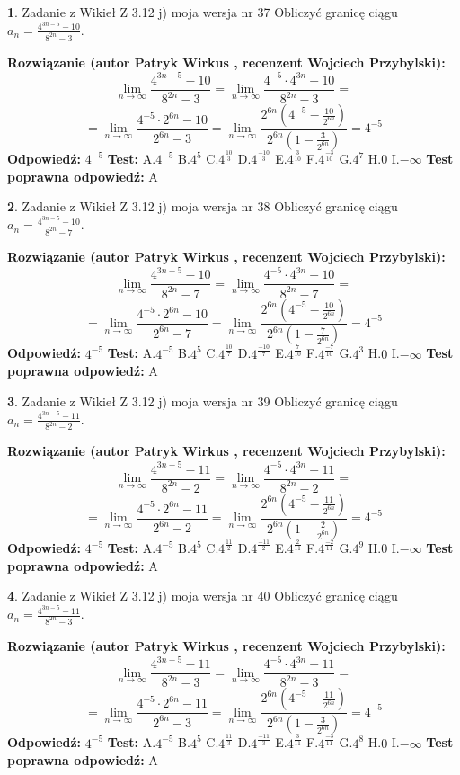 \documentclass[12pt, a4paper]{article}
\theoremstyle{definition} %
\newtheorem{zad}{}
\newcommand{\zadStart}[1]{\begin{zad}#1\newline}
\newcommand{\zadStop}{\end{zad}}
\newcommand{\rozwStart}[2]{\noindent \textbf{Rozwiązanie (autor #1 , recenzent #2): }\newline}
\newcommand{\rozwStop}{\newline}
\newcommand{\odpStart}{\noindent \textbf{Odpowiedź:}\newline}
\newcommand{\odpStop}{\newline}
\newcommand{\testStart}{\noindent \textbf{Test:}\newline}
\newcommand{\testStop}{\newline}
\newcommand{\kluczStart}{\noindent \textbf{Test poprawna odpowiedź:}\newline}
\newcommand{\kluczStop}{\newline}
\begin{document}
\zadStart{Zadanie z Wikieł Z 3.12 j) moja wersja nr 37}
Obliczyć granicę ciągu $a_{n}=\frac{4^{3n-5}-10}{8^{2n}-3}$.
\zadStop
\rozwStart{Patryk Wirkus}{Wojciech Przybylski}
$$\lim\limits_{n\to\infty}\frac{4^{3n-5}-10}{8^{2n}-3}= \lim\limits_{n\to\infty}\frac{4^{-5} \cdot 4^{3n}-10}{8^{2n}-3}=$$
$$= \lim\limits_{n\to\infty}\frac{4^{-5} \cdot 2^{6n}-10}{2^{6n}-3}= \lim\limits_{n\to\infty}\frac{2^{6n}(4^{-5} - \frac{10}{2^{6n}})}{2^{6n}(1-\frac{3}{2^{6n}})}= 4^{-5}$$
\rozwStop
\odpStart
$4^{-5}$
\odpStop
\testStart
A.$4^{-5}$
B.$4^{5}$
C.$4^{\frac{10}{3}}$
D.$4^{\frac{-10}{3}}$
E.$4^{\frac{3}{10}}$
F.$4^{\frac{-3}{10}}$
G.$4^{7}$
H.$0$
I.$-\infty$
\testStop
\kluczStart
A
\kluczStop



\zadStart{Zadanie z Wikieł Z 3.12 j) moja wersja nr 38}
Obliczyć granicę ciągu $a_{n}=\frac{4^{3n-5}-10}{8^{2n}-7}$.
\zadStop
\rozwStart{Patryk Wirkus}{Wojciech Przybylski}
$$\lim\limits_{n\to\infty}\frac{4^{3n-5}-10}{8^{2n}-7}= \lim\limits_{n\to\infty}\frac{4^{-5} \cdot 4^{3n}-10}{8^{2n}-7}=$$
$$= \lim\limits_{n\to\infty}\frac{4^{-5} \cdot 2^{6n}-10}{2^{6n}-7}= \lim\limits_{n\to\infty}\frac{2^{6n}(4^{-5} - \frac{10}{2^{6n}})}{2^{6n}(1-\frac{7}{2^{6n}})}= 4^{-5}$$
\rozwStop
\odpStart
$4^{-5}$
\odpStop
\testStart
A.$4^{-5}$
B.$4^{5}$
C.$4^{\frac{10}{7}}$
D.$4^{\frac{-10}{7}}$
E.$4^{\frac{7}{10}}$
F.$4^{\frac{-7}{10}}$
G.$4^{3}$
H.$0$
I.$-\infty$
\testStop
\kluczStart
A
\kluczStop



\zadStart{Zadanie z Wikieł Z 3.12 j) moja wersja nr 39}
Obliczyć granicę ciągu $a_{n}=\frac{4^{3n-5}-11}{8^{2n}-2}$.
\zadStop
\rozwStart{Patryk Wirkus}{Wojciech Przybylski}
$$\lim\limits_{n\to\infty}\frac{4^{3n-5}-11}{8^{2n}-2}= \lim\limits_{n\to\infty}\frac{4^{-5} \cdot 4^{3n}-11}{8^{2n}-2}=$$
$$= \lim\limits_{n\to\infty}\frac{4^{-5} \cdot 2^{6n}-11}{2^{6n}-2}= \lim\limits_{n\to\infty}\frac{2^{6n}(4^{-5} - \frac{11}{2^{6n}})}{2^{6n}(1-\frac{2}{2^{6n}})}= 4^{-5}$$
\rozwStop
\odpStart
$4^{-5}$
\odpStop
\testStart
A.$4^{-5}$
B.$4^{5}$
C.$4^{\frac{11}{2}}$
D.$4^{\frac{-11}{2}}$
E.$4^{\frac{2}{11}}$
F.$4^{\frac{-2}{11}}$
G.$4^{9}$
H.$0$
I.$-\infty$
\testStop
\kluczStart
A
\kluczStop



\zadStart{Zadanie z Wikieł Z 3.12 j) moja wersja nr 40}
Obliczyć granicę ciągu $a_{n}=\frac{4^{3n-5}-11}{8^{2n}-3}$.
\zadStop
\rozwStart{Patryk Wirkus}{Wojciech Przybylski}
$$\lim\limits_{n\to\infty}\frac{4^{3n-5}-11}{8^{2n}-3}= \lim\limits_{n\to\infty}\frac{4^{-5} \cdot 4^{3n}-11}{8^{2n}-3}=$$
$$= \lim\limits_{n\to\infty}\frac{4^{-5} \cdot 2^{6n}-11}{2^{6n}-3}= \lim\limits_{n\to\infty}\frac{2^{6n}(4^{-5} - \frac{11}{2^{6n}})}{2^{6n}(1-\frac{3}{2^{6n}})}= 4^{-5}$$
\rozwStop
\odpStart
$4^{-5}$
\odpStop
\testStart
A.$4^{-5}$
B.$4^{5}$
C.$4^{\frac{11}{3}}$
D.$4^{\frac{-11}{3}}$
E.$4^{\frac{3}{11}}$
F.$4^{\frac{-3}{11}}$
G.$4^{8}$
H.$0$
I.$-\infty$
\testStop
\kluczStart
A
\kluczStop
\end{document}
